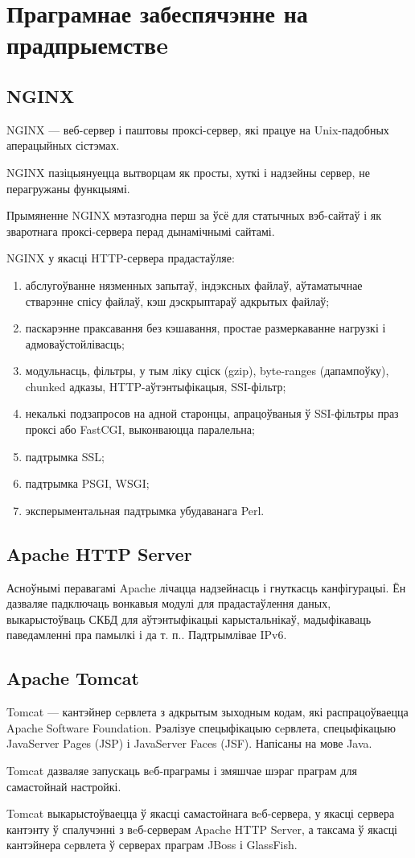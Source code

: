 \section{Праграмнае забеспячэнне на прадпрыемствe}

\subsection{NGINX}
NGINX --- веб-сервер і паштовы проксі-сервер, які працуе на Unix-падобных аперацыйных сістэмах.

NGINX пазіцыянуецца вытворцам як просты, хуткі і надзейны сервер, не перагружаны функцыямі.

Прымяненне NGINX мэтазгодна перш за ўсё для статычных вэб-сайтаў і як зваротнага проксі-сервера перад дынамічнымі сайтамі.

NGINX у якасці HTTP-сервера прадастаўляе:
\begin{enumerate}
    \item абслугоўванне нязменных запытаў, індэксных файлаў, аўтаматычнае стварэнне спісу файлаў, кэш дэскрыптараў адкрытых файлаў;
    \item паскарэнне праксавання без кэшавання, простае размеркаванне нагрузкі і адмоваўстойлівасць;
    \item модульнасць, фільтры, у тым ліку сціск (gzip), byte-ranges (дапампоўку), chunked адказы, HTTP-аўтэнтыфікацыя, SSI-фільтр;
    \item некалькі подзапросов на адной старонцы, апрацоўваныя ў SSI-фільтры праз проксі або FastCGI, выконваюцца паралельна;
    \item падтрымка SSL;
    \item падтрымка PSGI, WSGI;
    \item эксперыментальная падтрымка убудаванага Perl.
\end{enumerate}

\subsection{Apache HTTP Server}
Асноўнымі перавагамі Apache лічацца надзейнасць і гнуткасць канфігурацыі. Ён дазваляе
падключаць вонкавыя модулі для прадастаўлення даных,
выкарыстоўваць СКБД для аўтэнтыфікацыі карыстальнікаў, мадыфікаваць паведамленні пра памылкі і да т. п..
Падтрымлівае IPv6.

\subsection{Apache Tomcat}
Tomcat --- кантэйнер сeрвлета з адкрытым зыходным кодам, які распрацоўваецца Apache Software Foundation. Рэалізуе спецыфікацыю сeрвлета, спецыфікацыю JavaServer Pages (JSP) і JavaServer Faces (JSF). Напісаны на мове Java.

Tomcat дазваляе запускаць вeб-праграмы і змяшчае шэраг праграм для самастойнай настройкі.

Tomcat выкарыстоўваецца ў якасці самастойнага вeб-сервера, у якасці сервера кантэнту ў спалучэнні з вeб-серверам Apache HTTP Server, а таксама ў якасці кантэйнера сeрвлета ў серверах праграм JBoss і GlassFish.
